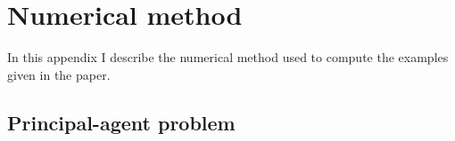 \documentclass[11pt]{article}
\theoremstyle{plain}
\begin{document}

\section{Numerical method}\label{num_appendix}

In this appendix I describe the numerical method used to compute the examples given in the paper.

\subsection{Principal-agent problem}
\end{document}
